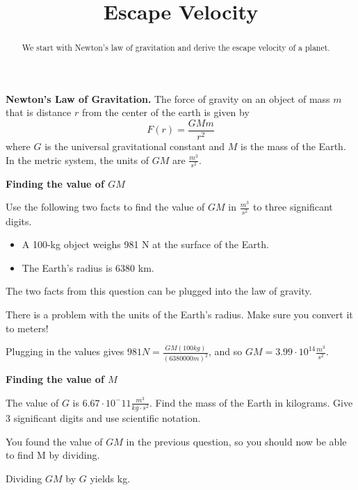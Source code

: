 \documentclass{ximera}
\title{Escape Velocity}
\begin{document}
\begin{abstract}
We start with Newton's law of gravitation and derive the escape velocity of a planet.
\end{abstract}
\maketitle

\begin{observation}
\textbf{Newton's Law of Gravitation.} The force of gravity on an object of mass $m$ that is distance $r$ from the center of the earth is given by
$$ F(r) = \frac{G M m}{r^2}$$
where $G$ is the universal gravitational constant and $M$ is the mass of the Earth. In the metric system, the units of $G M$ are $\frac{m^3}{s^2}$.
\end{observation}

\textbf{Finding the value of $GM$}

\begin{question}
Use the following two facts to find the value of $GM$ in $\frac{m^3}{s^2}$ to three significant digits. 
\begin{itemize}
\item A 100-kg object weighs 981 N at the surface of the Earth.
\item The Earth's radius is 6380 km.
\end{itemize}
\begin{solution}
\begin{multiple-choice}
\end{multiple-choice}
\begin{hint}
The two facts from this question can be plugged into the law of gravity.
\end{hint}
\begin{hint}
There is a problem with the units of the Earth's radius. Make sure you convert it to meters!
\end{hint}
Plugging in the values gives $981 N = \frac{GM (100 kg)}{(6380000 m)^2}$, and so $GM = 3.99 \cdot 10^{14} \frac{m^3}{s^2}$.
\end{solution}
\end{question}

\textbf{Finding the value of $M$}

\begin{question}
The value of $G$ is $6.67 \cdot 10^-{11} \frac{m^3}{kg \cdot s^2}$. Find the mass of the Earth in kilograms. Give 3 significant digits and use scientific notation.
\begin{solution}
\begin{hint}
You found the value of $G M$ in the previous question, so you should now be able to find M by dividing.
\end{hint}
Dividing $G M$ by $G$ yields  kg.
\end{solution}
\end{question}
\end{document}
